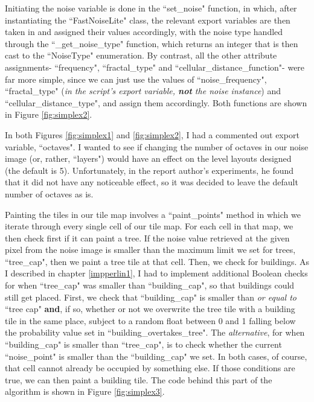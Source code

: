 Initiating the noise variable is done in the ``set\_noise" function, in which, after instantiating the ``FastNoiseLite" class, the relevant export variables are then taken in and assigned their values accordingly, with the noise type handled through the ``\_get\_noise\_type" function, which returns an integer that is then cast to the ``NoiseType" enumeration. By contrast, all the other attribute assignments- ``frequency", ``fractal\_type" and ``cellular\_distance\_function"- were far more simple, since we can just use the values of ``noise\_frequency", ``fractal\_type" (\textit{in the script's export variable, \textbf{not} the noise instance}) and ``cellular\_distance\_type", and assign them accordingly. Both functions are shown in Figure \ref{fig:simplex2}.

In both Figures \ref{fig:simplex1} and \ref{fig:simplex2}, I had a commented out export variable, ``octaves". I wanted to see if changing the number of octaves in our noise image (or, rather, ``layers") would have an effect on the level layouts designed (the default is 5\cite{fastnoiselitedocs}). Unfortunately, in the report author's experiments, he found that it did not have any noticeable effect, so it was decided to leave the default number of octaves as is. 

Painting the tiles in our tile map involves a ``paint\_points" method in which we iterate through every single cell of our tile map. For each cell in that map, we then check first if it can paint a tree. If the noise value retrieved at the given pixel from the noise image is smaller than the maximum limit we set for trees, ``tree\_cap", then we paint a tree tile at that cell. Then, we check for buildings. As I described in chapter \ref{impperlin1}, I had to implement additional Boolean checks for when ``tree\_cap" was smaller than ``building\_cap", so that buildings could still get placed. First, we check that ``building\_cap" is smaller than \textit{or equal to} ``tree cap" \textbf{and}, if so, whether or not we overwrite the tree tile with a building tile in the same place, subject to a random float between 0 and 1 falling below the probability value set in ``building\_overtakes\_tree". The \textit{alternative}, for when ``building\_cap" is smaller than ``tree\_cap", is to check whether the current ``noise\_point" is smaller than the ``building\_cap" we set. In both cases, of course, that cell cannot already be occupied by something else. If those conditions are true, we can then paint a building tile. The code behind this part of the algorithm is shown in Figure \ref{fig:simplex3}.

